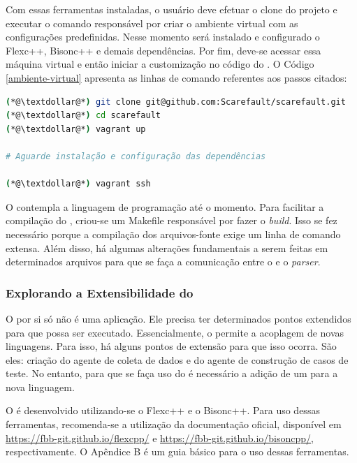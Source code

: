 Com essas ferramentas instaladas, o usuário deve efetuar o clone do projeto
e executar o comando responsável por criar o ambiente virtual com as configurações
predefinidas. Nesse momento será instalado e configurado o \textsf{Flexc++},
\textsf{Bisonc++} e demais dependências. Por fim, deve-se acessar essa máquina
virtual e então iniciar a customização no código do \Scarefault. O Código
\ref{ambiente-virtual} apresenta as linhas de comando referentes aos passos citados:

\begin{lstlisting}[language=bash, label=ambiente-virtual, caption=Levantamento do ambiente de desenvolvimento]
(*@\textdollar@*) git clone git@github.com:Scarefault/scarefault.git
(*@\textdollar@*) cd scarefault
(*@\textdollar@*) vagrant up

# Aguarde instalação e configuração das dependências

(*@\textdollar@*) vagrant ssh
\end{lstlisting}

O \scarefault contempla a linguagem de programação \grails até o momento.
Para facilitar a compilação do \Scarefault, criou-se um \textsf{Makefile}
responsável por fazer o \textit{build}. Isso se fez necessário porque a
compilação dos arquivos-fonte exige um linha de comando extensa. Além disso,
há algumas alterações fundamentais a serem feitas em determinados arquivos
para que se faça a comunicação entre o \scanner e o \textit{parser}.

\subsubsection{Explorando a Extensibilidade do \Scarefault}
O \scarefault por si só não é uma aplicação. Ele precisa ter determinados pontos
extendidos para que possa ser executado. Essencialmente, o \scarefault permite a
acoplagem de novas linguagens. Para isso, há alguns pontos de extensão para que
isso ocorra. São eles: criação do agente de coleta de dados e do agente de
construção de casos de teste. No entanto, para que se faça uso do \scarefault é
necessário a adição de um \parser para a nova linguagem.

O \parser é desenvolvido utilizando-se o \textsf{Flexc++} e o \textsf{Bisonc++}. Para
uso dessas ferramentas, recomenda-se a utilização da documentação oficial, disponível
em \url{https://fbb-git.github.io/flexcpp/} e \url{https://fbb-git.github.io/bisoncpp/},
respectivamente. O Apêndice B é um guia básico para o uso dessas ferramentas.

